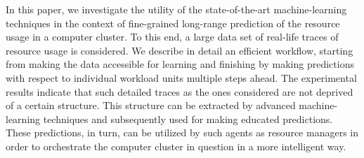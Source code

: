 In this paper, we investigate the utility of the state-of-the-art
machine-learning techniques in the context of fine-grained long-range prediction
of the resource usage in a computer cluster. To this end, a large data set of
real-life traces of resource usage is considered. We describe in detail an
efficient workflow, starting from making the data accessible for learning and
finishing by making predictions with respect to individual workload units
multiple steps ahead. The experimental results indicate that such detailed
traces as the ones considered are not deprived of a certain structure. This
structure can be extracted by advanced machine-learning techniques and
subsequently used for making educated predictions. These predictions, in turn,
can be utilized by such agents as resource managers in order to orchestrate the
computer cluster in question in a more intelligent way.
